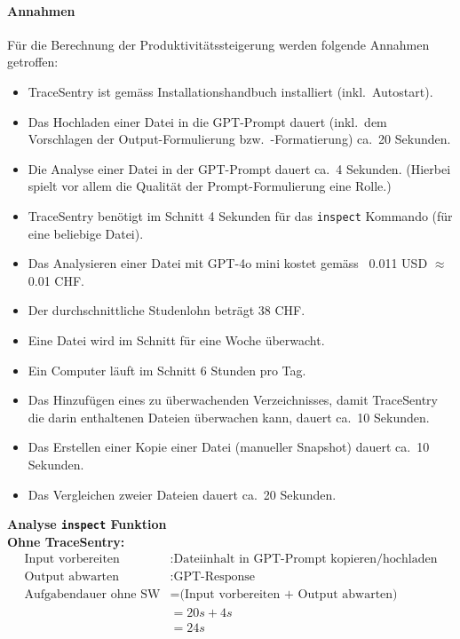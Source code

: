 \documentclass[a4paper,12pt]{report}
\begin{document}
    \paragraph*{Annahmen}
    Für die Berechnung der Produktivitätssteigerung werden folgende Annahmen getroffen:
    \begin{itemize}
        \item TraceSentry ist gemäss Installationshandbuch installiert (inkl.\ Autostart).
        \item Das Hochladen einer Datei in die GPT-Prompt dauert (inkl.\ dem Vorschlagen der Output-Formulierung bzw.\ -Formatierung) ca.\ 20 Sekunden.
        \item Die Analyse einer Datei in der GPT-Prompt dauert ca.\ 4 Sekunden.
        (Hierbei spielt vor allem die Qualität der Prompt-Formulierung eine Rolle.)
        \item TraceSentry benötigt im Schnitt 4 Sekunden für das \texttt{inspect} Kommando (für eine beliebige Datei).
        \item Das Analysieren einer Datei mit GPT-4o mini kostet gemäss~ 0.011 USD $\approx$ 0.01 CHF.
        \item Der durchschnittliche Studenlohn beträgt 38 CHF\@.
        \item Eine Datei wird im Schnitt für eine Woche überwacht.
        \item Ein Computer läuft im Schnitt 6 Stunden pro Tag.
        \item Das Hinzufügen eines zu überwachenden Verzeichnisses, damit TraceSentry die darin enthaltenen Dateien überwachen kann, dauert ca.\ 10 Sekunden.
        \item Das Erstellen einer Kopie einer Datei (manueller Snapshot) dauert ca.\ 10 Sekunden.
        \item Das Vergleichen zweier Dateien dauert ca.\ 20 Sekunden.
    \end{itemize}

    \clearpage

    \textbf{Analyse \texttt{inspect} Funktion} \\

    \textbf{Ohne TraceSentry:} \\
    \begin{align*}
        \text{Input vorbereiten}&: \text{Dateiinhalt in GPT-Prompt kopieren/hochladen}\\
        \text{Output abwarten}&: \text{GPT-Response} \\
        \text{Aufgabendauer ohne SW} &= \text{(Input vorbereiten + Output abwarten)} \\
        &= 20s + 4s \\
        &= 24s \\
    \end{align*}
\end{document}
